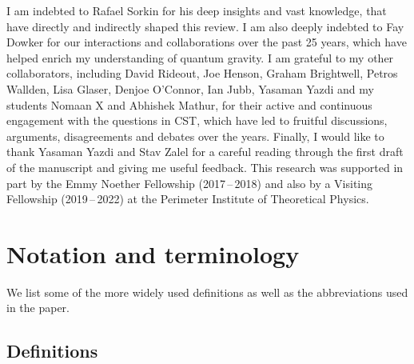 \begin{acknowledgements}
I am indebted to Rafael Sorkin for his deep insights and  vast
knowledge,  that have directly and indirectly shaped  this review. %
I  am also deeply indebted  to Fay Dowker for our  interactions  and
collaborations over the past 25 years, which have helped enrich my understanding of quantum gravity. I am 
grateful  to my  other
collaborators, 
including David Rideout, Joe Henson, Graham Brightwell, 
Petros Wallden, Lisa Glaser, Denjoe O'Connor,  Ian Jubb, Yasaman Yazdi and my students Nomaan X
and Abhishek Mathur, for their active and continuous engagement with
the questions in CST, which have led to fruitful discussions,
arguments, disagreements and  debates over the years. Finally, I would like to thank Yasaman Yazdi and  Stav Zalel  for
a careful reading through the first draft of the manuscript and giving me useful feedback. This research was supported
in part by the Emmy Noether Fellowship (2017\,--\,2018) and also by a  Visiting Fellowship (2019\,--\,2022) at the Perimeter
Institute of Theoretical Physics. 
\end{acknowledgements}

\appendix
\normalsize

\section{Notation and terminology} 
\label{sec:aone} 


We list some of the more widely used definitions as well as the abbreviations used in the paper.

\subsection*{Definitions}

